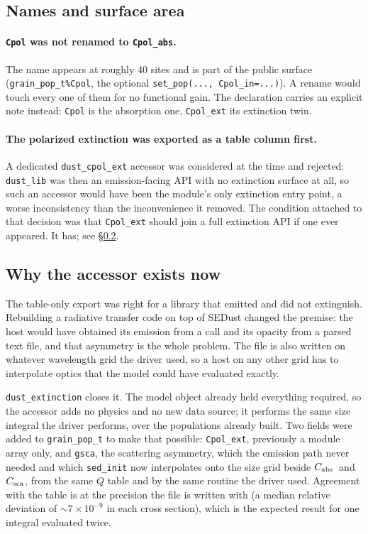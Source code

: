 \documentclass{my_memo}
\newcommand{\code}[1]{\texttt{#1}}
\newcommand{\Cabs}{\ensuremath{C_{\rm abs}}}
\begin{document}
\subsection{Names and surface area}

\paragraph{\code{Cpol} was not renamed to \code{Cpol\_abs}.} The name appears at
roughly 40 sites and is part of the public surface
(\code{grain\_pop\_t\%Cpol}, the optional \code{set\_pop(..., Cpol\_in=...)}).
A rename would touch every one of them for no functional gain. The declaration
carries an explicit note instead: \code{Cpol} is the absorption one,
\code{Cpol\_ext} its extinction twin.

\paragraph{The polarized extinction was exported as a table column first.} A
dedicated \code{dust\_cpol\_ext} accessor was considered at the time and
rejected: \code{dust\_lib} was then an emission-facing API with no extinction
surface at all, so such an accessor would have been the module's only
extinction entry point, a worse inconsistency than the inconvenience it
removed. The condition attached to that decision was that \code{Cpol\_ext}
should join a full extinction API if one ever appeared. It has;
see \S\ref{sec:whyaccessor}.

\subsection{Why the accessor exists now}\label{sec:whyaccessor}

The table-only export was right for a library that emitted and did not
extinguish. Rebuilding a radiative transfer code on top of SEDust changed the
premise: the host would have obtained its emission from a call and its opacity
from a parsed text file, and that asymmetry is the whole problem. The file is
also written on whatever wavelength grid the driver used, so a host on any
other grid has to interpolate optics that the model could have evaluated
exactly.

\code{dust\_extinction} closes it. The model object already held everything
required, so the accessor adds no physics and no new data source; it performs
the same size integral the driver performs, over the populations already
built. Two fields were added to \code{grain\_pop\_t} to make that possible:
\code{Cpol\_ext}, previously a module array only, and \code{gsca}, the
scattering asymmetry, which the emission path never needed and which
\code{sed\_init} now interpolates onto the size grid beside \Cabs\ and
$C_{\rm sca}$, from the same $Q$ table and by the same routine the driver used.
Agreement with the table is at the precision the file is written with (a median
relative deviation of $\sim7\times10^{-9}$ in each cross section), which is the
expected result for one integral evaluated twice.
\end{document}
